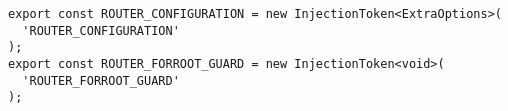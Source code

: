 \begin{verbatim}
export const ROUTER_CONFIGURATION = new InjectionToken<ExtraOptions>(
  'ROUTER_CONFIGURATION'
);
export const ROUTER_FORROOT_GUARD = new InjectionToken<void>(
  'ROUTER_FORROOT_GUARD'
);
\end{verbatim}
